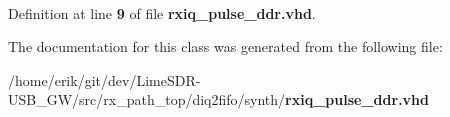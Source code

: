 \paragraph[{std\+\_\+logic\+\_\+1164}]{\hspace{0.3cm}{\ttfamily [Package]}}\label{classrxiq__pulse__ddr_acd03516902501cd1c7296a98e22c6fcb}


Definition at line {\bf 9} of file {\bf rxiq\+\_\+pulse\+\_\+ddr.\+vhd}.



The documentation for this class was generated from the following file\+:\begin{DoxyCompactItemize}
\item 
/home/erik/git/dev/\+Lime\+S\+D\+R-\/\+U\+S\+B\+\_\+\+G\+W/src/rx\+\_\+path\+\_\+top/diq2fifo/synth/{\bf rxiq\+\_\+pulse\+\_\+ddr.\+vhd}\end{DoxyCompactItemize}
